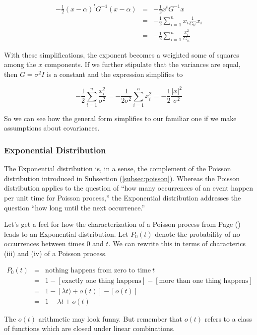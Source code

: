 \documentclass[]{article}
\begin{document}
\begin{eqnarray*}
-\frac{1}{2}(x-\alpha)^t G^{-1} (x-\alpha) &= &-\frac{1}{2} x^t G^{-1} x \\
  &= &-\frac{1}{2} \sum_{i=1}^n x_i \frac{1}{G_{ii}} x_i \\
  &= &-\frac{1}{2} \sum_{i=1}^n \frac{x_i^2}{G_{ii}}
\end{eqnarray*}

With these simplifications, the exponent becomes a weighted
some of squares among the $x$ components.  If we further
stipulate that the variances are equal, then $G = \sigma^2 I$
is a constant and the expression simplifies to

$$
-\frac{1}{2} \sum_{i=1}^n \frac{x_i^2}{\sigma^2} =
-\frac{1}{2\sigma^2} \sum_{i=1}^n x_i^2 =
-\frac{1}{2} \frac{|x|^2}{\sigma^2}
$$

So we can see how the general form simplifies to our
familiar one if we make assumptions about covariances.

\subsubsection{Exponential Distribution}

The Exponential distribution is, in a sense, the complement of
the Poisson distribution introduced in 
Subsection (\ref{subsec:poisson}).  Whereas the Poisson
distribution applies to the question of ``how many occurrences
of an event happen per unit time for Poisson process,'' 
the Exponential distribution addresses the question 
``how long until the next occurrence.''

Let's get a feel for how the characterization of a Poisson 
process from
Page (\pageref{poisson_properties}) leads to an Exponential
distribution.  Let $P_0(t)$ denote the probability of no
occurrences between times 0 and $t$.  We can rewrite this
in terms of characterics (iii) and (iv) of a Poisson process.

\begin{eqnarray*}
P_0(t) &= & \mbox{nothing happens from zero to time} \: t \\
  &= & 1 - [\mbox{exactly one thing happens}] - 
     [ \mbox{more than one thing happens} ] \\
  &= & 1 - [\lambda t) + o(t)] - [ o(t) ] \\
  &= & 1 - \lambda t + o(t)
\end{eqnarray*}

The $o(t)$ arithmetic may look funny.  But remember that $o(t)$
refers to a class of functions which are closed under linear
combinations.
\end{document}
